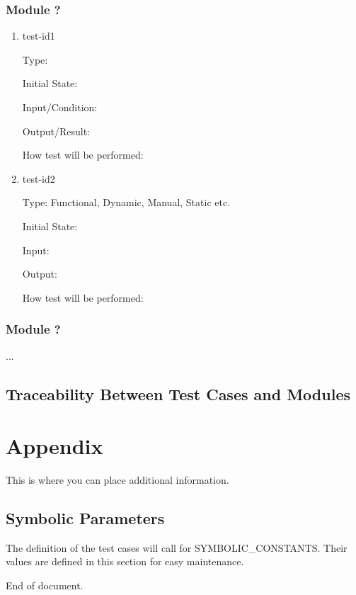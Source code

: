 \documentclass[12pt, titlepage]{article}
\begin{document}
\subsubsection{Module ?}
		
\begin{enumerate}

\item{test-id1\\}

Type: 
					
Initial State: 
					
Input/Condition: 
					
Output/Result: 
					
How test will be performed: 
					
\item{test-id2\\}

Type: Functional, Dynamic, Manual, Static etc.
					
Initial State: 
					
Input: 
					
Output: 
					
How test will be performed: 

\end{enumerate}

\subsubsection{Module ?}

...

\subsection{Traceability Between Test Cases and Modules}

				




\newpage

\section{Appendix}

This is where you can place additional information.

\subsection{Symbolic Parameters}

The definition of the test cases will call for SYMBOLIC\_CONSTANTS.
Their values are defined in this section for easy maintenance.

\newpage{}
\centering
End of document.
\end{document}
